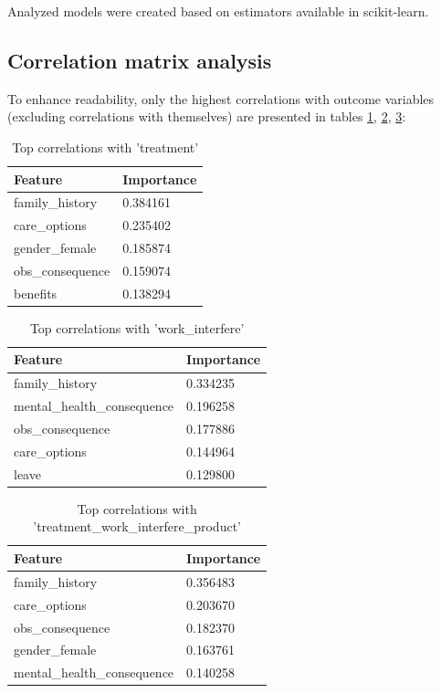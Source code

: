\documentclass[conference]{IEEEtran}
\begin{document}
Analyzed models were created based on estimators available in scikit-learn.

\subsection{Correlation matrix analysis}
To enhance readability, only the highest correlations with outcome variables (excluding correlations with themselves) are presented in tables \ref{tab:top-corr-treatment}, \ref{tab:top-corr-work-interfere}, \ref{tab:top-corr-prod}: 

\begin{table}[h]
\centering
\begin{tabular}{|l|l|}
\hline
\textbf{Feature} & \textbf{Importance} \\ \hline
family\_history  & 0.384161            \\ \hline
care\_options    & 0.235402            \\ \hline
gender\_female   & 0.185874            \\ \hline
obs\_consequence & 0.159074            \\ \hline
benefits         & 0.138294            \\ \hline
\end{tabular}
\caption{Top correlations with 'treatment'}
\label{tab:top-corr-treatment}
\end{table}
\begin{table}[H]
\centering
\begin{tabular}{|l|l|}
\hline
\textbf{Feature}            & \textbf{Importance} \\ \hline
family\_history             & 0.334235            \\ \hline
mental\_health\_consequence & 0.196258            \\ \hline
obs\_consequence            & 0.177886            \\ \hline
care\_options               & 0.144964            \\ \hline
leave                       & 0.129800            \\ \hline
\end{tabular}
\caption{Top correlations with 'work\_interfere'}
\label{tab:top-corr-work-interfere}
\end{table}
\begin{table}[H]
\centering
\begin{tabular}{|l|l|}
\hline
\textbf{Feature}            & Importance \\ \hline
family\_history             & 0.356483   \\ \hline
care\_options               & 0.203670   \\ \hline
obs\_consequence            & 0.182370   \\ \hline
gender\_female              & 0.163761   \\ \hline
mental\_health\_consequence & 0.140258   \\ \hline
\end{tabular}
\caption{Top correlations with 'treatment\_work\_interfere\_product'}
\label{tab:top-corr-prod}
\end{table}
\end{document}
